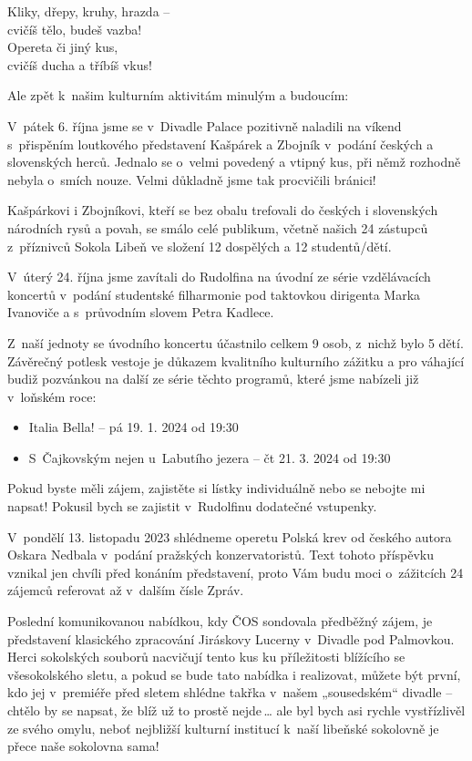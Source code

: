 \documentclass[11pt]{article}
\begin{document}
\begin{center}
Kliky, dřepy, kruhy, hrazda –\\
cvičíš tělo, budeš vazba!\\
Opereta či jiný kus,\\
cvičíš ducha a tříbíš vkus!
\end{center}

\noindent
Ale zpět k~našim kulturním aktivitám minulým a budoucím:

V~pátek 6. října jsme se v~Divadle Palace pozitivně naladili na víkend s~přispěním loutkového představení Kašpárek a Zbojník v~podání českých a slovenských herců. Jednalo se o~velmi povedený a vtipný kus, při němž rozhodně nebyla o~smích nouze. Velmi důkladně jsme tak procvičili bránici!

Kašpárkovi i Zbojníkovi, kteří se bez obalu trefovali do českých i slovenských národních rysů a povah, se smálo celé publikum, včetně našich 24 zástupců z~příznivců Sokola Libeň ve složení 12 dospělých a 12 studentů/dětí.

V~úterý 24. října jsme zavítali do Rudolfina na úvodní ze série vzdělávacích koncertů v~podání studentské filharmonie pod taktovkou dirigenta Marka Ivanoviče a s~průvodním slovem Petra Kadlece.

Z~naší jednoty se úvodního koncertu účastnilo celkem 9 osob, z~nichž bylo 5 dětí. Závěrečný potlesk vestoje je důkazem kvalitního kulturního zážitku a pro váhající budiž pozvánkou na další ze série těchto programů, které jsme nabízeli již v~loňském roce:

\renewcommand{\arraystretch}{1}
\begin{itemize}
  \setlength\itemsep{-3pt}
  \item Italia Bella! – pá 19. 1. 2024 od 19:30
  \item S~Čajkovským nejen u~Labutího jezera – čt 21. 3. 2024 od 19:30
\end{itemize}

Pokud byste měli zájem, zajistěte si lístky individuálně nebo se nebojte mi napsat! Pokusil bych se zajistit v~Rudolfinu dodatečné vstupenky.

V~pondělí 13. listopadu 2023 shlédneme operetu Polská krev od českého autora Oskara Nedbala v~podání pražských konzervatoristů. Text tohoto příspěvku vznikal jen chvíli před konáním představení, proto Vám budu moci o~zážitcích 24 zájemců referovat až v~dalším čísle Zpráv.

Poslední komunikovanou nabídkou, kdy ČOS sondovala předběžný zájem, je představení klasického zpracování Jiráskovy Lucerny v~Divadle pod Palmovkou. Herci sokolských souborů nacvičují tento kus ku příležitosti blížícího se všesokolského sletu, a pokud se bude tato nabídka i realizovat, můžete být první, kdo jej v~premiéře před sletem shlédne takřka v~našem „sousedském“ divadle – chtělo by se napsat, že blíž už to prostě nejde\,\ldots{} ale byl bych asi rychle vystřízlivěl ze svého omylu, neboť nejbližší kulturní institucí k~naší libeňské sokolovně je přece naše sokolovna sama!
\end{document}

